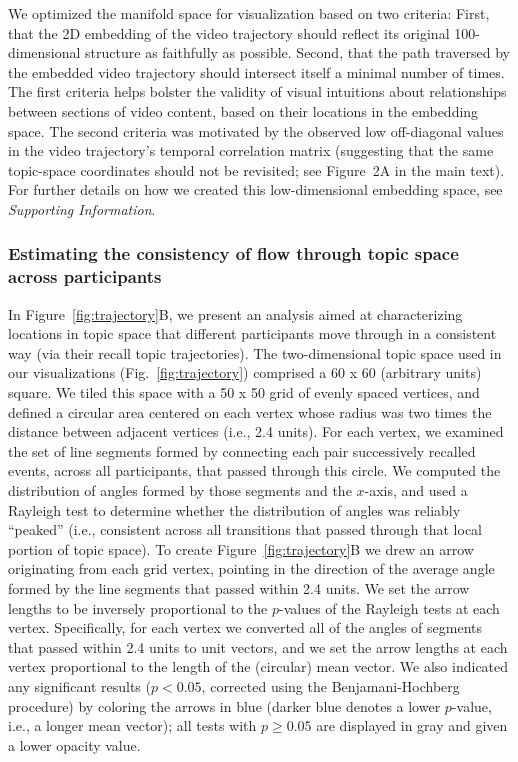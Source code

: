 \documentclass{article}
\begin{document}
We optimized the manifold space for visualization based on two criteria: First, that the 2D embedding of the video trajectory should reflect its original 100-dimensional structure as faithfully as possible. Second, that the path traversed by the embedded video trajectory should intersect itself a minimal number of times.  The first criteria helps bolster the validity of visual intuitions about relationships between sections of video content, based on their locations in the embedding space.  The second criteria was motivated by the observed low off-diagonal values in the video trajectory's temporal correlation matrix (suggesting that the same topic-space coordinates should not be revisited; see Figure~2A in the main text). For further details on how we created this low-dimensional embedding space, see \textit{Supporting Information}.

\subsubsection*{Estimating the consistency of flow through topic space across participants}
In Figure~\ref{fig:trajectory}B, we present an analysis aimed at characterizing locations in topic space that different participants move through in a consistent way (via their recall topic trajectories).  The two-dimensional topic space used in our visualizations (Fig.~\ref{fig:trajectory}) comprised a 60 x 60 (arbitrary units) square.  We tiled this space with a 50 x 50 grid of evenly spaced vertices, and defined a circular area centered on each vertex whose radius was two times the distance between adjacent vertices (i.e., 2.4 units).  For each vertex, we examined the set of line segments formed by connecting each pair successively recalled events, across all participants, that passed through this circle.  We computed the distribution of angles formed by those segments and the $x$-axis, and used a Rayleigh test to determine whether the distribution of angles was reliably ``peaked'' (i.e., consistent across all transitions that passed through that local portion of topic space).  To create Figure~\ref{fig:trajectory}B we drew an arrow originating from each grid vertex, pointing in the direction of the average angle formed by the line segments that passed within 2.4 units.  We set the arrow lengths to be inversely proportional to the $p$-values of the Rayleigh tests at each vertex.  Specifically, for each vertex we converted all of the angles of segments that passed within 2.4 units to unit vectors, and we set the arrow lengths at each vertex proportional to the length of the (circular) mean vector.  We also indicated any significant results ($p < 0.05$, corrected using the Benjamani-Hochberg procedure) by coloring the arrows in blue (darker blue denotes a lower $p$-value, i.e., a longer mean vector); all tests with $p \geq 0.05$ are displayed in gray and given a lower opacity value.
\end{document}
